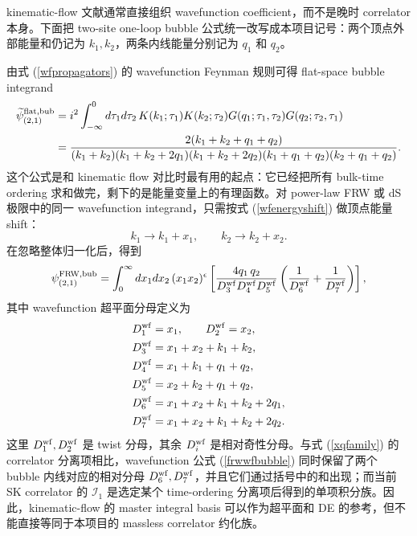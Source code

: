 ﻿\documentclass[a4paper,11pt]{article}
\begin{document}
kinematic-flow 文献通常直接组织 wavefunction coefficient，而不是晚时 correlator 本身。下面把 two-site one-loop bubble 公式统一改写成本项目记号：两个顶点外部能量和仍记为 $k_1,k_2$，两条内线能量分别记为 $q_1$ 和 $q_2$。

由式 (\ref{wfpropagators}) 的 wavefunction Feynman 规则可得 flat-space bubble integrand \cite{Hang:2024frw}
\begin{align}
    \widetilde{\psi}^{\rm flat,bub}_{(2,1)}
    &=
    i^2\int_{-\infty}^{0}d\tau_1d\tau_2\,
    K(k_1;\tau_1)K(k_2;\tau_2)
    G(q_1;\tau_1,\tau_2)
    G(q_2;\tau_2,\tau_1)\notag\\
    &=
    \frac{2(k_1+k_2+q_1+q_2)}
    {(k_1+k_2)
     (k_1+k_2+2q_1)
     (k_1+k_2+2q_2)
     (k_1+q_1+q_2)
     (k_2+q_1+q_2)}.
    \label{flatwfbubble}
\end{align}
这个公式是和 kinematic flow 对比时最有用的起点：它已经把所有 bulk-time ordering 求和做完，剩下的是能量变量上的有理函数。对 power-law FRW 或 dS 极限中的同一 wavefunction integrand，只需按式 (\ref{wfenergyshift}) 做顶点能量 shift：
\begin{equation}
    k_1\to k_1+x_1,\qquad k_2\to k_2+x_2.
\end{equation}
在忽略整体归一化后，得到
\begin{equation}
    \psi^{\rm FRW,bub}_{(2,1)}
    =
    \int_0^\infty dx_1dx_2\,(x_1x_2)^\epsilon
    \left[
    \frac{4q_1\,q_2}
    {D^{\rm wf}_3D^{\rm wf}_4D^{\rm wf}_5}
    \left(\frac{1}{D^{\rm wf}_6}+\frac{1}{D^{\rm wf}_7}\right)
    \right],
    \label{frwwfbubble}
\end{equation}
其中 wavefunction 超平面分母定义为
\begin{align}
    D^{\rm wf}_1&=x_1,\qquad
    D^{\rm wf}_2=x_2,\notag\\
    D^{\rm wf}_3&=x_1+x_2+k_1+k_2,\notag\\
    D^{\rm wf}_4&=x_1+k_1+q_1+q_2,\notag\\
    D^{\rm wf}_5&=x_2+k_2+q_1+q_2,\notag\\
    D^{\rm wf}_6&=x_1+x_2+k_1+k_2+2q_1,\notag\\
    D^{\rm wf}_7&=x_1+x_2+k_1+k_2+2q_2.
    \label{wfbubbledenoms}
\end{align}
这里 $D^{\rm wf}_1,D^{\rm wf}_2$ 是 twist 分母，其余 $D^{\rm wf}_i$ 是相对奇性分母。与式 (\ref{xqfamily}) 的 correlator 分离项相比，wavefunction 公式 (\ref{frwwfbubble}) 同时保留了两个 bubble 内线对应的相对分母 $D^{\rm wf}_6,D^{\rm wf}_7$，并且它们通过括号中的和出现；而当前 SK correlator 的 $\mathcal{I}_1$ 是选定某个 time-ordering 分离项后得到的单项积分族。因此，kinematic-flow 的 master integral basis 可以作为超平面和 DE 的参考，但不能直接等同于本项目的 massless correlator 约化族。
\end{document}
